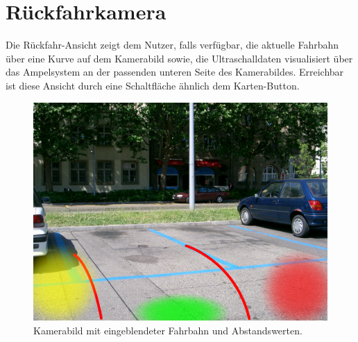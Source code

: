 \documentclass[pflichtenheft.tex]{subfiles}
\begin{document}
\clearpage
\section{Rückfahrkamera}

Die Rückfahr-Ansicht zeigt dem Nutzer, falls verfügbar, die aktuelle Fahrbahn über eine Kurve auf dem Kamerabild sowie, die Ultraschalldaten visualisiert über das Ampelsystem an der passenden unteren Seite des Kamerabildes. Erreichbar ist diese Ansicht durch eine Schaltfläche ähnlich dem Karten-Button.

\begin{figure}[H]
  	\begin{center}
 		\includegraphics[width=\textwidth]{Images/GUI-BackDrive.jpg}
  		\caption{Kamerabild mit eingeblendeter Fahrbahn und Abstandswerten.}
  	\end{center}
\end{figure}
\end{document}
